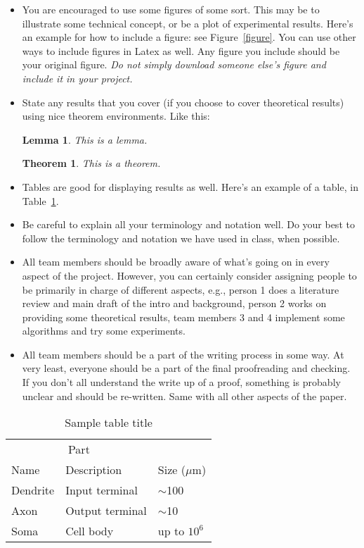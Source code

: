 \documentclass{article}
\newtheorem{theorem}{Theorem}
\newtheorem{lemma}{Lemma}
\begin{document}
	\begin{itemize}
		\item  You are encouraged to use some figures of some sort. This may be to illustrate some technical concept, or be a plot of experimental results. Here's an example for how to include a figure: see Figure~\ref{figure}. You can use other ways to include figures in Latex as well. 	Any figure you include should be your original figure. \emph{Do not simply download someone else's figure and include it in your project.}
		\item State any results that you cover (if you choose to cover theoretical results) using nice theorem environments. Like this:
		\begin{lemma}
			This is a lemma. 
		\end{lemma}
		\begin{theorem}
			This is a theorem.
		\end{theorem}
		\item Tables are good for displaying results as well. Here's an example of a table, in Table~\ref{sample-table}.	
		\item Be careful to explain all your terminology and notation well. Do your best to follow the terminology and notation we have used in class, when possible. 
		\item All team members should be broadly aware of what's going on in every aspect of the project. However, you can certainly consider assigning people to be primarily in charge of different aspects, e.g., person 1 does a literature review and main draft of the intro and background, person 2 works on providing some theoretical results, team members 3 and 4 implement some algorithms and try some experiments. 
		\item All team members should be a part of the writing process in some way. At very least, everyone should be a part of the final proofreading and checking. If you don't all understand the write up of a proof, something is probably unclear and should be re-written. Same with all other aspects of the paper.
	\end{itemize}
	\begin{table}
		\caption{Sample table title}
		\label{sample-table}
		\centering
		\begin{tabular}{lll}
			\toprule
			\multicolumn{2}{c}{Part}                   \\
			\cmidrule(r){1-2}
			Name     & Description     & Size ($\mu$m) \\
			\midrule
			Dendrite & Input terminal  & $\sim$100     \\
			Axon     & Output terminal & $\sim$10      \\
			Soma     & Cell body       & up to $10^6$  \\
			\bottomrule
		\end{tabular}
	\end{table}
\end{document}
